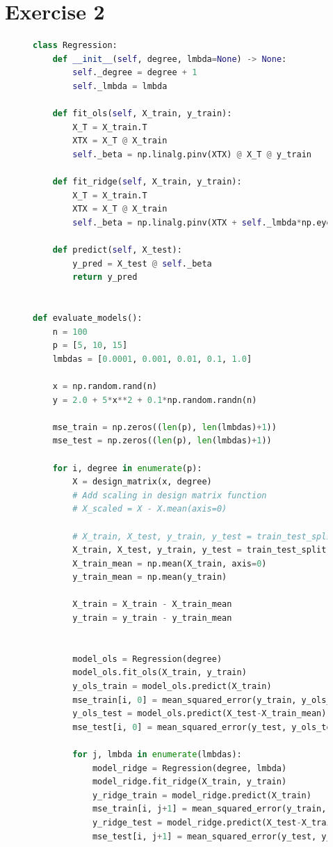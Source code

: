 \section{Exercise 2}\label{sec:ex2}
\begin{figure}

\begin{lstlisting}[language=Python]
class Regression:
    def __init__(self, degree, lmbda=None) -> None:
        self._degree = degree + 1
        self._lmbda = lmbda

    def fit_ols(self, X_train, y_train):
        X_T = X_train.T
        XTX = X_T @ X_train
        self._beta = np.linalg.pinv(XTX) @ X_T @ y_train 

    def fit_ridge(self, X_train, y_train):
        X_T = X_train.T
        XTX = X_T @ X_train
        self._beta = np.linalg.pinv(XTX + self._lmbda*np.eye(len(XTX))) @ X_T @ y_train 
    
    def predict(self, X_test):
        y_pred = X_test @ self._beta
        return y_pred 
    

def evaluate_models():
    n = 100
    p = [5, 10, 15]
    lmbdas = [0.0001, 0.001, 0.01, 0.1, 1.0]

    x = np.random.rand(n)
    y = 2.0 + 5*x**2 + 0.1*np.random.randn(n)

    mse_train = np.zeros((len(p), len(lmbdas)+1))
    mse_test = np.zeros((len(p), len(lmbdas)+1))

    for i, degree in enumerate(p):
        X = design_matrix(x, degree)
        # Add scaling in design matrix function
        # X_scaled = X - X.mean(axis=0)

        # X_train, X_test, y_train, y_test = train_test_split(X_scaled, y, test_size=0.2)
        X_train, X_test, y_train, y_test = train_test_split(X, y, test_size=0.2)
        X_train_mean = np.mean(X_train, axis=0)
        y_train_mean = np.mean(y_train)

        X_train = X_train - X_train_mean
        y_train = y_train - y_train_mean


        model_ols = Regression(degree)
        model_ols.fit_ols(X_train, y_train)
        y_ols_train = model_ols.predict(X_train)
        mse_train[i, 0] = mean_squared_error(y_train, y_ols_train)
        y_ols_test = model_ols.predict(X_test-X_train_mean)
        mse_test[i, 0] = mean_squared_error(y_test, y_ols_test+y_train_mean)

        for j, lmbda in enumerate(lmbdas):
            model_ridge = Regression(degree, lmbda)
            model_ridge.fit_ridge(X_train, y_train)
            y_ridge_train = model_ridge.predict(X_train)
            mse_train[i, j+1] = mean_squared_error(y_train, y_ridge_train)
            y_ridge_test = model_ridge.predict(X_test-X_train_mean)
            mse_test[i, j+1] = mean_squared_error(y_test, y_ridge_test+y_train_mean)


\end{lstlisting}
\end{figure}
